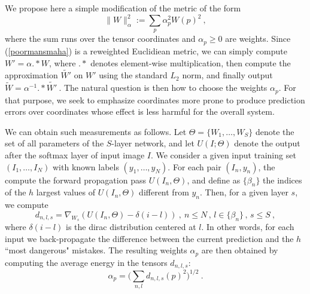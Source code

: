 
We propose here a simple modification of the metric of the form 
\begin{equation}
\label{poormansmaha}
\| W \|_\alpha^2 := \sum_p \alpha_p^2 W(p)^2 ~,
\end{equation}
where the sum runs over the tensor coordinates and $\alpha_p \geq 0$ are weights.
Since (\ref{poormansmaha}) is a reweighted Euclidiean metric, we 
can simply compute $W' = \alpha .* W$, where $.*$ denotes element-wise multiplication, 
then compute the approximation $\widetilde{W'}$ on $W'$ using the standard $L_2$ norm, 
and finally output $\widetilde{W} = \alpha^{-1} .* \widetilde{W'}~.$
The natural question is then how to choose the weights $\alpha_p$. For that purpose, 
we seek to emphasize coordinates more prone to produce prediction errors over 
coordinates whose effect is less harmful for the overall system. 

We can obtain such measurements as follows. Let $\Theta=\{W_1,\dots,W_S\}$ denote
the set of all parameters of the $S$-layer network, and let $U(I; \Theta)$ denote the output 
after the softmax layer of input image $I$.
We consider  a given input training set $(I_1,\dots,I_N)$ 
with known labels $(y_1,\dots,y_N)$. For each pair $(I_n, y_n)$, 
the compute the forward propagation pass $U(I_n, \Theta)$, and 
define as $\{\beta_n\}$ the indices of the $h$ largest values of  $U(I_n, \Theta)$ 
different from $y_n$.
Then, for a given layer $s$, we compute
\begin{equation}
\label{approxi}
d_{n,l,s} = \nabla_{W_s} \left( U(I_n, \Theta) - \delta(i - l)\right)~,~n\leq N\,,\, l \in \{\beta_n\}\,,\, s\leq S~,
\end{equation}
where $\delta(i-l)$ is the dirac distribution centered at $l$.
In other words, for each input we back-propagate the difference between the current prediction and the 
$h$ ``most dangerous" mistakes. 
The resulting weights $\alpha_p$ are then obtained by computing the average energy in the tensors $d_{n,l,s}$:
$$\alpha_p = \Big( \sum_{n,l} d_{n,l,s}(p)^2 \Big)^{1/2}~.$$

